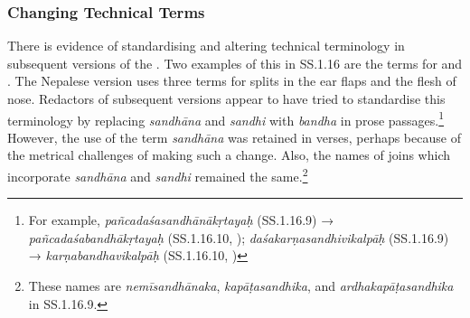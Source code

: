




\subsubsection{Changing Technical Terms}
There is evidence of standardising and altering technical terminology in subsequent versions of the \SS. Two examples of this in SS.1.16 are the terms for  and . The Nepalese version uses three terms for  splits in the ear flaps and the flesh of nose. Redactors of subsequent versions appear to have tried to standardise this terminology by replacing \emph{sandhāna} and \emph{sandhi} with \emph{bandha} in prose passages.\footnote{For example, \emph{pañcadaśasandhānākṛtayaḥ} (SS.1.16.9) → \emph{pañcadaśabandhākṛtayaḥ} (SS.1.16.10, \cite[77]{vulgate}); \emph{daśakarṇasandhivikalpāḥ} (SS.1.16.9) → \emph{karṇabandhavikalpāḥ} (SS.1.16.10, \cite[77]{vulgate})} However, the use of the term \emph{sandhāna} was retained in verses, perhaps because of the metrical challenges of making such a change. Also, the names of joins which incorporate \emph{sandhāna} and \emph{sandhi} remained the same.\footnote{These names are \emph{nemīsandhānaka}, \emph{kapāṭasandhika}, and \emph{ardhakapāṭasandhika} in SS.1.16.9.}


